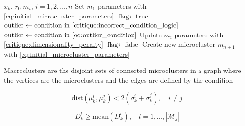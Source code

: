 \documentclass[a4paper]{article}
\begin{document}
\begin{algorithm}[H]
\caption{Microcluster update}
\label{alg:microcluster_update}
\begin{algorithmic}[1]
\Require $x_k$, $r_0$
\Ensure $m_i$, $i = 1, 2, \dots, n$
        \State Set $m_1$ parameters with \cref{eq:initial_microcluster_parameters}
    \Else
        \State $\text{flag} \gets \text{true}$
                $\text{outlier} \gets \text{condition in \cref{critique:incorrect_condition_logic}}$
            \Else
                $\text{outlier} \gets \text{condition in \cref{eq:outlier_condition}}$
            \EndIf
                \State Update $m_i$ parameters with \cref{critique:dimensionality_penalty}
                \State $\text{flag} \gets \text{false}$
            \EndIf
        \EndFor
            \State Create new microcluster $m_{n+1}$ with \cref{eq:initial_microcluster_parameters}
        \EndIf
    \EndIf
\EndWhile
\end{algorithmic}
\end{algorithm}

Macroclusters are the disjoint sets of connected microclusters in a graph where the vertices are the microclusters and the edges are defined by the condition

\begin{equation}
    \text{dist}(\mu^i_k, \mu^j_k) < 2 \left( \sigma^i_k + \sigma^j_k \right), \quad i \neq j \label{eq:microcluster_intersection_condition}
\end{equation}


\begin{equation}
    D^l_k \ge \text{mean}\left(D^l_k\right), \quad l = 1,\dots,\left|\mathcal{M}_j\right| \label{critique:use_of_unstable_density}
\end{equation}

\end{document}
